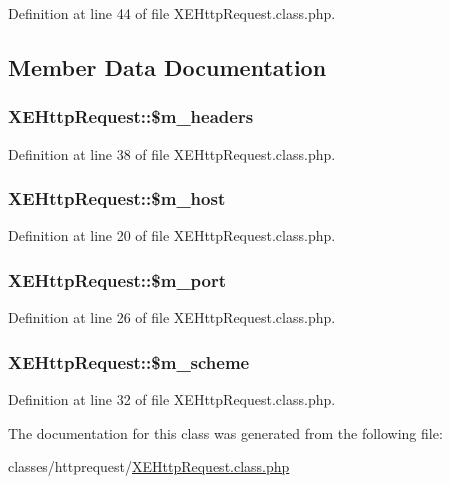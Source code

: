Definition at line 44 of file X\+E\+Http\+Request.\+class.\+php.



\subsection{Member Data Documentation}
\hypertarget{classXEHttpRequest_a36df236b46af2f09dd9020096dbaed22}{
\subsubsection[{\$m\+\_\+headers}]{\setlength{\rightskip}{0pt plus 5cm}X\+E\+Http\+Request\+::\$m\+\_\+headers}}\label{classXEHttpRequest_a36df236b46af2f09dd9020096dbaed22}


Definition at line 38 of file X\+E\+Http\+Request.\+class.\+php.

\hypertarget{classXEHttpRequest_ad88148dced2b42017a96b2a5dd0b533a}{
\subsubsection[{\$m\+\_\+host}]{\setlength{\rightskip}{0pt plus 5cm}X\+E\+Http\+Request\+::\$m\+\_\+host}}\label{classXEHttpRequest_ad88148dced2b42017a96b2a5dd0b533a}


Definition at line 20 of file X\+E\+Http\+Request.\+class.\+php.

\hypertarget{classXEHttpRequest_a35c62f61b5ad2c200c53a58dd43a2784}{
\subsubsection[{\$m\+\_\+port}]{\setlength{\rightskip}{0pt plus 5cm}X\+E\+Http\+Request\+::\$m\+\_\+port}}\label{classXEHttpRequest_a35c62f61b5ad2c200c53a58dd43a2784}


Definition at line 26 of file X\+E\+Http\+Request.\+class.\+php.

\hypertarget{classXEHttpRequest_a501919f00934ef2cc76300fa32c2f19d}{
\subsubsection[{\$m\+\_\+scheme}]{\setlength{\rightskip}{0pt plus 5cm}X\+E\+Http\+Request\+::\$m\+\_\+scheme}}\label{classXEHttpRequest_a501919f00934ef2cc76300fa32c2f19d}


Definition at line 32 of file X\+E\+Http\+Request.\+class.\+php.



The documentation for this class was generated from the following file\+:\begin{DoxyCompactItemize}
\item 
classes/httprequest/\hyperlink{XEHttpRequest_8class_8php}{X\+E\+Http\+Request.\+class.\+php}\end{DoxyCompactItemize}
